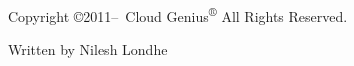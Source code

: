 %
%

\vspace*{\fill}
\setlength{\parindent}{0pt}

\ifx\mycopyright\undefined
\else
	\textcopyright{} \mycopyright
\fi

\begin{minipage}[b]{0.9\textwidth}
\footnotesize\raggedright
\setlength{\parskip}{0.5\baselineskip}
Copyright \copyright 2011--\the\year\ Cloud Genius\textsuperscript{®} All Rights Reserved.
\par
Written by Nilesh Londhe
\end{minipage}

\setlength{\parindent}{1em}
\clearpage
